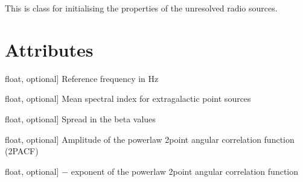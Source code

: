 \documentclass[letterpaper,10pt,english]{sphinxmanual}
\begin{document}
\begin{fulllineitems}
\label{\detokenize{api:furs.furs}}
\pysigstartsignatures
{}
\pysigstopsignatures
\sphinxAtStartPar
This is class for initialising the properties of the unresolved radio sources.


\section{Attributes}
\label{\detokenize{api:attributes}}\begin{description}
\sphinxlineitem{nu\_o}{[}float, optional{]}
\sphinxAtStartPar
Reference frequency in Hz

\sphinxlineitem{beta\_o}{[}float, optional{]}
\sphinxAtStartPar
Mean spectral index for extragalactic point sources

\sphinxlineitem{sigma\_beta}{[}float, optional{]}
\sphinxAtStartPar
Spread in the beta values

\sphinxlineitem{amp}{[}float, optional{]}
\sphinxAtStartPar
Amplitude of the power\sphinxhyphen{}law 2\sphinxhyphen{}point angular correlation function (2PACF)

\sphinxlineitem{gam}{[}float, optional{]}
\sphinxAtStartPar
\(-\) exponent of the power\sphinxhyphen{}law 2\sphinxhyphen{}point angular correlation function


\end{description}
\end{fulllineitems}
\end{document}
